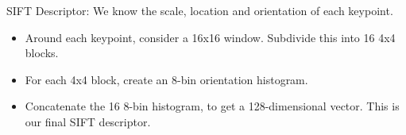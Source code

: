 SIFT Descriptor: We know the scale, location and orientation of each keypoint. 
\begin{itemize}
	\item Around each keypoint, consider a 16x16 window. Subdivide this into 16 4x4 blocks.
	\item For each 4x4 block, create an 8-bin orientation histogram. 
	\item Concatenate the 16 8-bin histogram, to get a 128-dimensional vector. This is our final SIFT descriptor. 
\end{itemize}

 



















 



 





